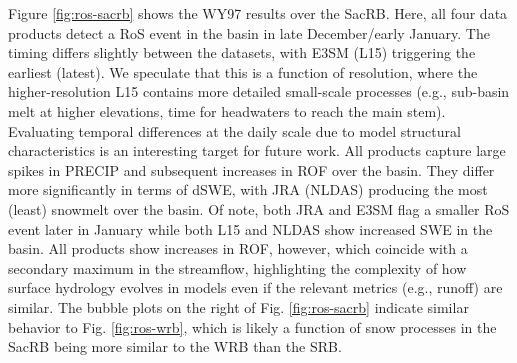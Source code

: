 \documentclass{article}
\begin{document}
Figure \ref{fig:ros-sacrb} shows the WY97 results over the SacRB.
Here, all four data products detect a RoS event in the basin in late December/early January.
The timing differs slightly between the datasets, with E3SM (L15) triggering the earliest (latest).
We speculate that this is a function of resolution, where the higher-resolution L15 contains more detailed small-scale processes (e.g., sub-basin melt at higher elevations, time for headwaters to reach the main stem).
Evaluating temporal differences at the daily scale due to model structural characteristics is an interesting target for future work.
All products capture large spikes in PRECIP and subsequent increases in ROF over the basin.
They differ more significantly in terms of dSWE, with JRA (NLDAS) producing the most (least) snowmelt over the basin.
Of note, both JRA and E3SM flag a smaller RoS event later in January while both L15 and NLDAS show increased SWE in the basin.
All products show increases in ROF, however, which coincide with a secondary maximum in the streamflow, highlighting the complexity of how surface hydrology evolves in models even if the relevant metrics (e.g., runoff) are similar.
The bubble plots on the right of Fig. \ref{fig:ros-sacrb} indicate similar behavior to Fig. \ref{fig:ros-wrb}, which is likely a function of snow processes in the SacRB being more similar to the WRB than the SRB.
\end{document}
